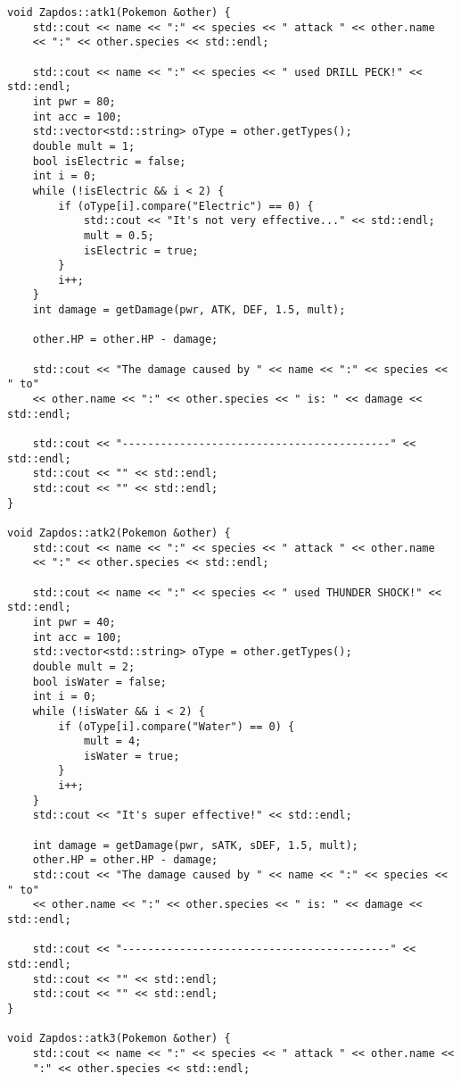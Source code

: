 \documentclass[11pt]{article}
\begin{document}
\begin{itemize}
\begin{lstlisting}
void Zapdos::atk1(Pokemon &other) {
    std::cout << name << ":" << species << " attack " << other.name 
    << ":" << other.species << std::endl;
    
    std::cout << name << ":" << species << " used DRILL PECK!" << std::endl;
    int pwr = 80;
    int acc = 100;
    std::vector<std::string> oType = other.getTypes();
    double mult = 1;
    bool isElectric = false;
    int i = 0;
    while (!isElectric && i < 2) {
        if (oType[i].compare("Electric") == 0) {
            std::cout << "It's not very effective..." << std::endl;
            mult = 0.5;
            isElectric = true;
        }
        i++;
    }
    int damage = getDamage(pwr, ATK, DEF, 1.5, mult);

    other.HP = other.HP - damage;
    
    std::cout << "The damage caused by " << name << ":" << species << " to" 
    << other.name << ":" << other.species << " is: " << damage << std::endl;
    
    std::cout << "------------------------------------------" << std::endl;
    std::cout << "" << std::endl;
    std::cout << "" << std::endl;
}

void Zapdos::atk2(Pokemon &other) {
    std::cout << name << ":" << species << " attack " << other.name 
    << ":" << other.species << std::endl;
    
    std::cout << name << ":" << species << " used THUNDER SHOCK!" << std::endl;
    int pwr = 40;
    int acc = 100;
    std::vector<std::string> oType = other.getTypes();
    double mult = 2;
    bool isWater = false;
    int i = 0;
    while (!isWater && i < 2) {
        if (oType[i].compare("Water") == 0) {
            mult = 4;
            isWater = true;
        }
        i++;
    }
    std::cout << "It's super effective!" << std::endl;

    int damage = getDamage(pwr, sATK, sDEF, 1.5, mult);
    other.HP = other.HP - damage;
    std::cout << "The damage caused by " << name << ":" << species << " to" 
    << other.name << ":" << other.species << " is: " << damage << std::endl;
    
    std::cout << "------------------------------------------" << std::endl;
    std::cout << "" << std::endl;
    std::cout << "" << std::endl;
}

void Zapdos::atk3(Pokemon &other) {
    std::cout << name << ":" << species << " attack " << other.name <<
    ":" << other.species << std::endl;
    

\end{lstlisting}
\end{itemize}
\end{document}
